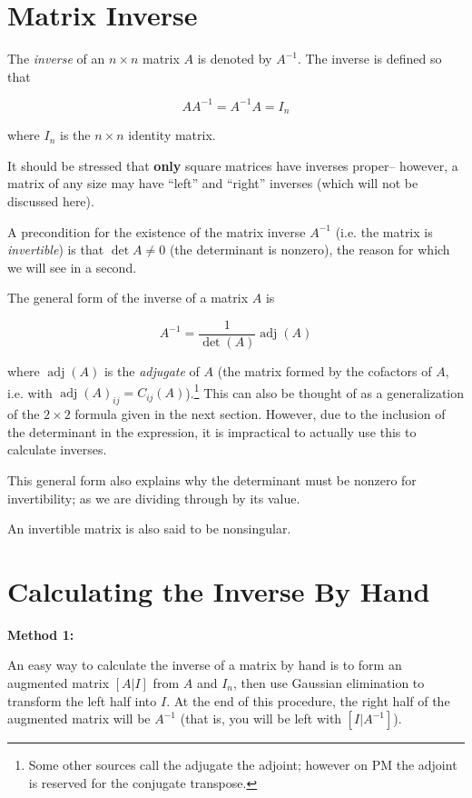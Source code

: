 \documentclass[12pt]{article}
\begin{document}
\section{Matrix Inverse}

The \emph{inverse} of an $n \times n$ matrix $A$ is denoted by $A^{-1}$.  The inverse is defined so that 

$$ A A^{-1} = A^{-1}A = I_n $$

where $I_n$ is the $n \times n$ identity matrix.

It should be stressed that \textbf{only} square matrices have inverses proper-- however, a matrix of any size may have ``left'' and ``right'' inverses (which will not be discussed here).

A precondition for the existence of the matrix inverse $A^{-1}$ (i.e. the matrix is \emph{invertible}) is that $\det A \ne 0$ (the determinant is nonzero), the reason for which we will see in a second. 

The general form of the inverse of a matrix $A$ is

$$ A^{-1} = \frac{1}{\det(A)} \operatorname{adj}(A) $$

where $\operatorname{adj}(A)$ is the \emph{adjugate} of $A$ (the matrix formed by the cofactors of $A$, i.e. with $\operatorname{adj}(A)_{ij} = C_{ij}(A)$).\footnote{Some other sources call the adjugate the adjoint; however on PM the adjoint is reserved for the conjugate transpose.}  This can also be thought of as a generalization of the $2 \times 2$ formula given in the next section.  However, due to the inclusion of the determinant in the expression, it is impractical to actually use this to calculate inverses.

This general form also explains why the determinant must be nonzero for invertibility; as we are dividing through by its value.

An invertible matrix is also said to be nonsingular.

\section{Calculating the Inverse By Hand}

\textbf{Method 1:}

An easy way to calculate the inverse of a matrix by hand is to form an augmented matrix $[A|I]$ from $A$ and $I_n$, then use Gaussian elimination to transform the left half into $I$.  At the end of this procedure, the right half of the augmented matrix will be $A^{-1}$ (that is, you will be left with $[I|A^{-1}]$).
\end{document}

